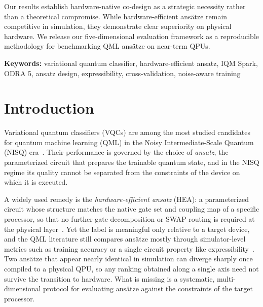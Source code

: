 \documentclass[11pt]{article}
\begin{document}
Our results establish hardware-native co-design as a strategic necessity rather than a theoretical compromise. While hardware-efficient ansätze remain competitive in simulation, they demonstrate clear superiority on physical hardware. We release our five-dimensional evaluation framework as a reproducible methodology for benchmarking QML ansätze on near-term QPUs.

\noindent\textbf{Keywords:} variational quantum classifier, hardware-efficient ansatz, IQM Spark, ODRA 5, ansatz design, expressibility, cross-validation, noise-aware training



\section{Introduction}

Variational quantum classifiers (VQCs) are among the most studied candidates for quantum machine learning (QML) in the Noisy Intermediate-Scale Quantum (NISQ) era~\cite{havlicek2019}. Their performance is governed by the choice of \emph{ansatz}, the parameterized circuit that prepares the trainable quantum state, and in the NISQ regime its quality cannot be separated from the constraints of the device on which it is executed.

A widely used remedy is the \emph{hardware-efficient ansatz} (HEA): a parameterized circuit whose structure matches the native gate set and coupling map of a specific processor, so that no further gate decomposition or SWAP routing is required at the physical layer~\cite{ma2024hea}. Yet the label is meaningful only relative to a target device, and the QML literature still compares ansätze mostly through simulator-level metrics such as training accuracy or a single circuit property like expressibility~\cite{sim2019}. Two ansätze that appear nearly identical in simulation can diverge sharply once compiled to a physical QPU, so any ranking obtained along a single axis need not survive the transition to hardware. What is missing is a systematic, multi-dimensional protocol for evaluating ansätze against the constraints of the target processor.
\end{document}
